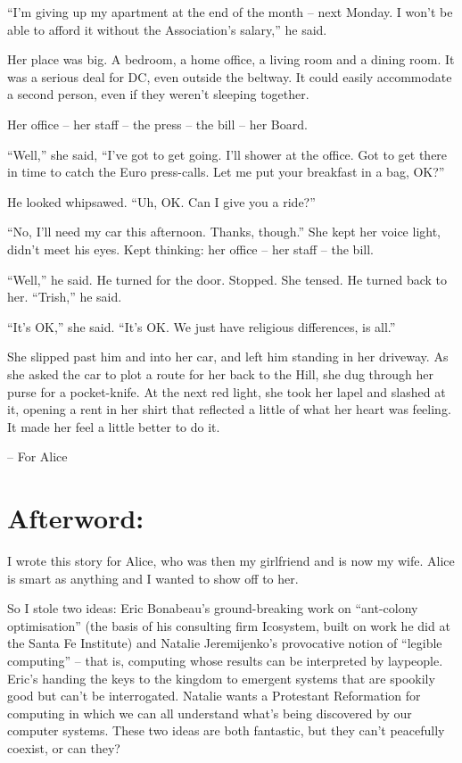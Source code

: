 “I'm giving up my apartment at the end of the month -- next Monday. I 
won't be able to afford it without the Association's salary,” he said.

Her place was big. A bedroom, a home office, a living room and a dining 
room. It was a serious deal for DC, even outside the beltway. It could 
easily accommodate a second person, even if they weren't sleeping 
together.

Her office -- her staff -- the press -- the bill -- her Board.

“Well,” she said, “I've got to get going. I'll shower at the 
office. Got to get there in time to catch the Euro press-calls. Let me 
put your breakfast in a bag, OK?”

He looked whipsawed. “Uh, OK. Can I give you a ride?”

“No, I'll need my car this afternoon. Thanks, though.” She kept her 
voice light, didn't meet his eyes. Kept thinking: her office -- her 
staff -- the bill.

“Well,” he said. He turned for the door. Stopped. She tensed. He 
turned back to her. “Trish,” he said.

“It's OK,” she said. “It's OK. We just have religious 
differences, is all.”

She slipped past him and into her car, and left him standing in her 
driveway. As she asked the car to plot a route for her back to the 
Hill, she dug through her purse for a pocket-knife. At the next red 
light, she took her lapel and slashed at it, opening a rent in her 
shirt that reflected a little of what her heart was feeling. It made 
her feel a little better to do it.

-- For Alice

\section{Afterword:}

I wrote this story for Alice, who was then my girlfriend and is now my 
wife. Alice is smart as anything and I wanted to show off to her.

So I stole two ideas: Eric Bonabeau's ground-breaking work on 
“ant-colony optimisation” (the basis of his consulting firm 
Icosystem, built on work he did at the Santa Fe Institute) and Natalie 
Jeremijenko's provocative notion of “legible computing” -- that is, 
computing whose results can be interpreted by laypeople. Eric's handing 
the keys to the kingdom to emergent systems that are spookily good but 
can't be interrogated. Natalie wants a Protestant Reformation for 
computing in which we can all understand what's being discovered by our 
computer systems. These two ideas are both fantastic, but they can't 
peacefully coexist, or can they?


